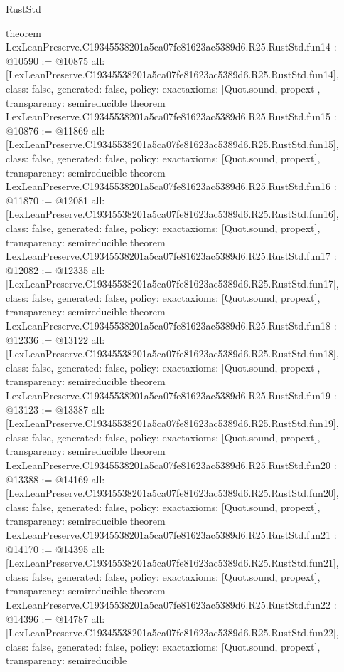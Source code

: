 \begin{lexlean}{RustStd}
\begin{coremodule}
{}
theorem LexLeanPreserve.C19345538201a5ca07fe81623ac5389d6.R25.RustStd.fun14 : @10590 := @10875 {
  all: [LexLeanPreserve.C19345538201a5ca07fe81623ac5389d6.R25.RustStd.fun14],
  class: false,
  generated: false,
  policy: exact{axioms: [Quot.sound, propext]},
  transparency: semireducible
}
theorem LexLeanPreserve.C19345538201a5ca07fe81623ac5389d6.R25.RustStd.fun15 : @10876 := @11869 {
  all: [LexLeanPreserve.C19345538201a5ca07fe81623ac5389d6.R25.RustStd.fun15],
  class: false,
  generated: false,
  policy: exact{axioms: [Quot.sound, propext]},
  transparency: semireducible
}
theorem LexLeanPreserve.C19345538201a5ca07fe81623ac5389d6.R25.RustStd.fun16 : @11870 := @12081 {
  all: [LexLeanPreserve.C19345538201a5ca07fe81623ac5389d6.R25.RustStd.fun16],
  class: false,
  generated: false,
  policy: exact{axioms: [Quot.sound, propext]},
  transparency: semireducible
}
theorem LexLeanPreserve.C19345538201a5ca07fe81623ac5389d6.R25.RustStd.fun17 : @12082 := @12335 {
  all: [LexLeanPreserve.C19345538201a5ca07fe81623ac5389d6.R25.RustStd.fun17],
  class: false,
  generated: false,
  policy: exact{axioms: [Quot.sound, propext]},
  transparency: semireducible
}
theorem LexLeanPreserve.C19345538201a5ca07fe81623ac5389d6.R25.RustStd.fun18 : @12336 := @13122 {
  all: [LexLeanPreserve.C19345538201a5ca07fe81623ac5389d6.R25.RustStd.fun18],
  class: false,
  generated: false,
  policy: exact{axioms: [Quot.sound, propext]},
  transparency: semireducible
}
theorem LexLeanPreserve.C19345538201a5ca07fe81623ac5389d6.R25.RustStd.fun19 : @13123 := @13387 {
  all: [LexLeanPreserve.C19345538201a5ca07fe81623ac5389d6.R25.RustStd.fun19],
  class: false,
  generated: false,
  policy: exact{axioms: [Quot.sound, propext]},
  transparency: semireducible
}
theorem LexLeanPreserve.C19345538201a5ca07fe81623ac5389d6.R25.RustStd.fun20 : @13388 := @14169 {
  all: [LexLeanPreserve.C19345538201a5ca07fe81623ac5389d6.R25.RustStd.fun20],
  class: false,
  generated: false,
  policy: exact{axioms: [Quot.sound, propext]},
  transparency: semireducible
}
theorem LexLeanPreserve.C19345538201a5ca07fe81623ac5389d6.R25.RustStd.fun21 : @14170 := @14395 {
  all: [LexLeanPreserve.C19345538201a5ca07fe81623ac5389d6.R25.RustStd.fun21],
  class: false,
  generated: false,
  policy: exact{axioms: [Quot.sound, propext]},
  transparency: semireducible
}
theorem LexLeanPreserve.C19345538201a5ca07fe81623ac5389d6.R25.RustStd.fun22 : @14396 := @14787 {
  all: [LexLeanPreserve.C19345538201a5ca07fe81623ac5389d6.R25.RustStd.fun22],
  class: false,
  generated: false,
  policy: exact{axioms: [Quot.sound, propext]},
  transparency: semireducible
}
\end{coremodule}
\end{lexlean}
